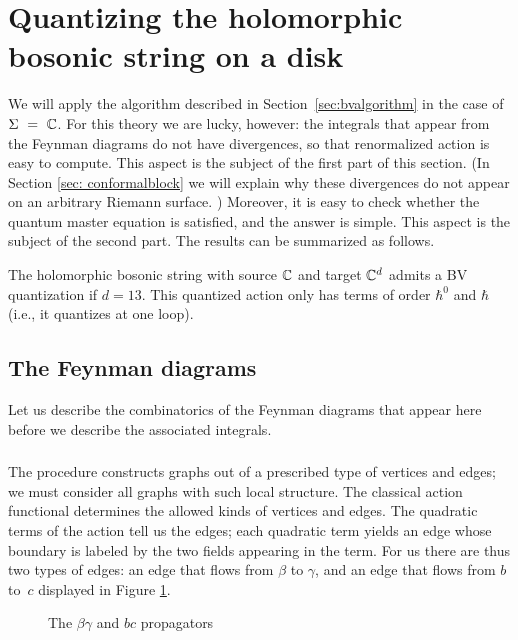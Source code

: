 \section{Quantizing the holomorphic bosonic string on a disk} 
\label{sec: quantization}


We will apply the algorithm described in Section~\ref{sec:bvalgorithm}
in the case of $\Sigma~=~\mathbb C$.
For this theory we are lucky, however:
the integrals that appear from the Feynman diagrams do not have divergences,
so that renormalized action is easy to compute.
This aspect is the subject of the first part of this section.
(In Section \ref{sec: conformalblock} we will explain why these divergences do not appear on an arbitrary Riemann surface. )
Moreover, it is easy to check whether the quantum master equation is satisfied,
and the answer is simple.
This aspect is the subject of the second part.
The results can be summarized as follows.

\begin{prop}
The holomorphic bosonic string with source $\mathbb C$ and target $\mathbb C^d$ admits a BV quantization
if $d = 13$.
This quantized action only has terms of order $\hbar^0$ and $\hbar$ (i.e., it quantizes at one loop).
\end{prop}

\subsection{The Feynman diagrams}

Let us describe the combinatorics of the Feynman diagrams that appear here
before we describe the associated integrals.

\subsubsection{}

The procedure constructs graphs out of a prescribed type of vertices and edges;
we must consider all graphs with such local structure.
The classical action functional determines the allowed kinds of vertices and edges.
The quadratic terms of the action tell us the edges;
each quadratic term yields an edge whose boundary is labeled by the two fields appearing in the term.
For us there are thus two types of edges: 
an edge that flows from $\beta$ to $\gamma$, 
and an edge that flows from $b$ to~$c$ displayed in Figure \ref{fig:props}.
\begin{figure}
\caption{The $\beta\gamma$ and $bc$ propagators}
\label{fig:props}
\end{figure}

